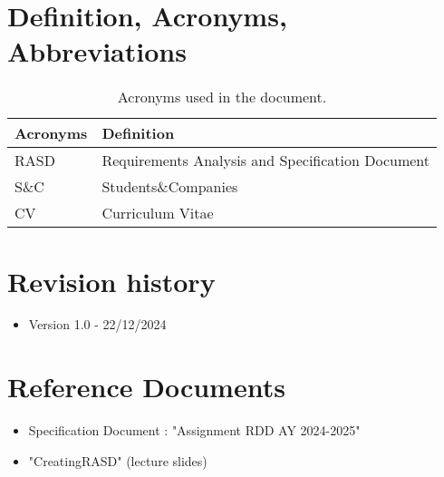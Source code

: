 \section{Definition, Acronyms, Abbreviations}
\label{sec:definition_acronyms_abbreviations}%
\begin{table}[H]
    \begin{center}
        \begin{tabular}{ |l|l| }
            \hline
            \textbf{Acronyms} & \textbf{Definition}                              \\
            \hline
            RASD & Requirements Analysis and Specification Document \\ \hline
            S\&C & Students\&Companies \\ \hline
            CV & Curriculum Vitae \\ \hline
        \end{tabular}
        \caption{Acronyms used in the document.}
        \label{tab:acronyms}%
    \end{center}
\end{table}


\section{Revision history}
\label{sec:revision_history}%
 \begin{itemize}
     \item Version 1.0 - 22/12/2024
 \end{itemize}

\section{Reference Documents}
\label{sec:reference_documents}%
\begin{itemize}
    \item Specification Document : "Assignment RDD AY 2024-2025"
    \item "CreatingRASD" (lecture slides)
\end{itemize}


